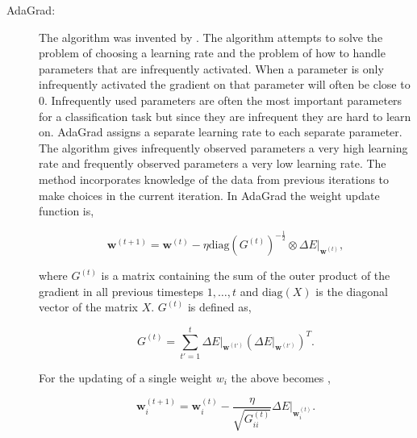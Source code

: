 \begin{description}

    \item[\gls{AdaGrad}:]

        The algorithm was invented by \citet{Duchi:2011:ASM:1953048.2021068}.
        The algorithm attempts to solve the problem of choosing a learning
        rate and the problem of how to handle parameters that are infrequently
        activated. When a parameter is only infrequently activated the gradient
        on that parameter will often be close to 0. Infrequently used parameters
        are often the most important parameters for a classification task but
        since they are infrequent they are hard to learn on. \gls{AdaGrad}
        assigns a separate learning rate to each separate parameter. The
        algorithm gives infrequently observed parameters a very high learning
        rate and frequently observed parameters a very low learning rate. The
        method incorporates knowledge of the data from previous iterations to
        make choices in the current iteration. In \gls{AdaGrad} the weight
        update function is,

        \begin{equation}
            \mathbf{w}^{(t+1)} =
                \mathbf{w}^{(t)} -
                \eta \text{diag}\left(G^{(t)}\right)^{-\frac{1}{2}} \otimes
                \Delta E|_{\mathbf{w}^{(t)}},
        \end{equation}

        where $G^{(t)}$ is a matrix containing the sum of the outer product
        of the gradient in all previous timesteps $1, \dots, t$ and
        $\text{diag}(X)$ is the diagonal vector of the matrix $X$. $G^{(t)}$ is
        defined as,

        \begin{equation}
            G^{(t)} = \sum_{t'=1}^t \Delta E|_{\mathbf{w}^{(t')}}
                \left(
                    \Delta E|_{\mathbf{w}^{(t')}}
                \right)^T.
        \end{equation}

        For the updating of a single weight $w_i$ the above becomes
        \citep{Duchi:2011:ASM:1953048.2021068},

        \begin{equation}
            \label{eq:individual_adagrad}
            \mathbf{w}_i^{(t+1)} =
                \mathbf{w}_i^{(t)} - \frac{\eta}{\sqrt{G^{(t)}_{ii}}}
                \Delta E|_{\mathbf{w}_i^{(t)}}.
        \end{equation}


\end{description}
